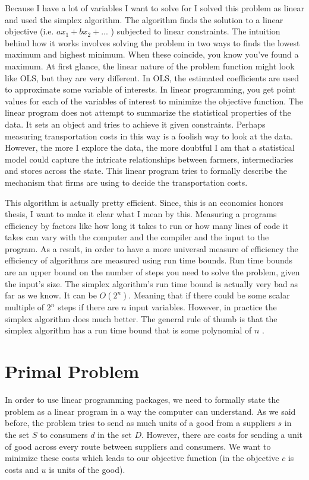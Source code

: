 \documentclass{report}
\begin{document}
Because I have a lot of variables I want to solve for I solved this problem as linear and used the simplex algorithm. The algorithm finds the solution to a linear objective (i.e. $a x_1 +b x_2 + ...$ ) subjected to linear constraints. The intuition behind how it works involves solving the problem in two ways to finds the lowest maximum and highest minimum. When these coincide,  you know you've found a maximum. At first glance, the  linear nature of the problem function might look like OLS, but they are very different. In OLS, the estimated coefficients are used to approximate some variable of interests. In linear programming, you get point values for each of the variables of interest to minimize the objective function. The linear program does not attempt to summarize the statistical properties of the data. It sets an object and tries to achieve it given constraints. Perhaps measuring transportation costs in this way is a foolish way to look at the data. However, the more I explore the data, the more doubtful I am that a statistical model could capture the intricate relationships between farmers, intermediaries and stores across the state. This linear program tries to formally describe the mechanism that firms are using to decide the transportation costs.

This algorithm is actually pretty efficient. Since, this is an economics honors thesis, I want to make it clear what I mean by this. Measuring a programs efficiency by factors like how long it takes to run or how many lines of code it takes can vary with the computer and the compiler and the input to the program. As a result, in order to have a more universal measure of efficiency the efficiency of algorithms are measured using run time bounds. Run time bounds are an upper bound on the number of steps you need to solve the problem, given the input's size.  The simplex algorithm's run time bound is actually very bad as far as we know. It can be $O(2^n)$. Meaning that if there could be some scalar multiple of $2^n$ steps if there are $n$ input variables. However, in practice the simplex algorithm does much better. The general rule of thumb is that the simplex algorithm has a run time bound that is some polynomial of $n$ \cite{Cook}.

\section{Primal Problem}

In order to use linear programming packages, we need to formally state the problem as a linear program in a way the computer can understand. As we said before, the problem tries to send as much units of a good from a suppliers $s$ in the set $S$ to consumers $d$ in the set $D$. However, there are costs for sending a unit of good across every route between suppliers and consumers. We want to minimize these costs which leads to our objective function (in the objective $c$ is costs and $u$ is units of the good). 
\end{document}
